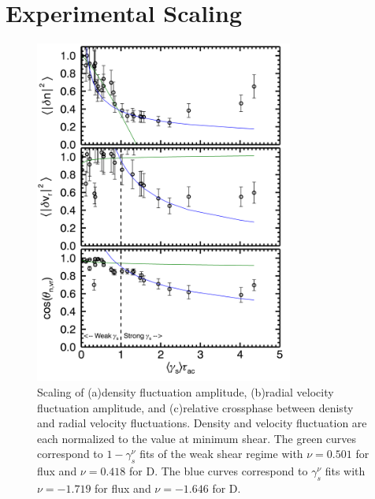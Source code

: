 \documentclass[aip,pop,amsmath,amssymb,preprint,superscriptaddress]{revtex4-1} %
\begin{document}
\section{Experimental Scaling}

\begin{figure}[!htbp]
\centerline{
\includegraphics[width=8.5cm]{densvrcp}}
\caption{\label{fig:densvrcp} Scaling of (a)density fluctuation amplitude, (b)radial velocity fluctuation amplitude, and (c)relative crossphase between denisty and radial velocity fluctuations. Density and velocity fluctuation are each normalized to the value at minimum shear. The green curves correspond to $1-\gamma_{s}^{\nu}$ fits of the weak shear regime with $\nu = 0.501$ for flux and $\nu = 0.418$ for D. The blue curves correspond to $\gamma_{s}^{\nu}$ fits with $\nu = -1.719$ for flux and $\nu = -1.646$ for D.}
\end{figure}
\end{document}
